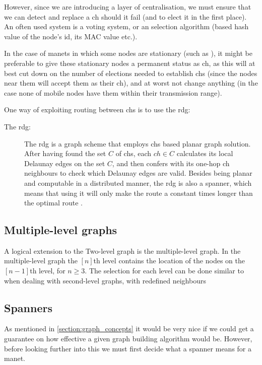 However, since we are introducing a layer of centralisation, we must ensure that we can detect and replace a \ac{ch} should it fail (and to elect it in the first place). An often used system is a voting system, or an selection algorithm (based hash value of the node's id, its MAC value etc.).

In the case of \acp{manet} in which some nodes are stationary (such as \cite{two-tier}), it might be preferable to give these stationary nodes a permanent status as \ac{ch}, as this will at best cut down on the number of elections needed to establish \acp{ch} (since the nodes near them will accept them as their \ac{ch}), and at worst not change anything (in the case none of mobile nodes have them within their transmission range).

One way of exploiting routing between \acp{ch} is to use the \ac{rdg}:
\begin{description}
\item[The \ac{rdg}:] The \ac{rdg} is a graph scheme that employs \acp{ch} based planar graph solution. After having found the set $C$ of \acp{ch}, each $ch \in C$ calculates its local Delaunay edges on the set $C$, and then confers with its one-hop \ac{ch} neighbours to check which Delaunay edges are valid. Besides being planar and computable in a distributed manner, the \ac{rdg} is also a spanner, which means that using it will only make the route a constant times longer than the optimal route \cite{GeoSpanners}.
\end{description}

\subsection{Multiple-level graphs}
A logical extension to the Two-level graph is the multiple-level graph. In the multiple-level graph the $[n]$th level contains the location of the nodes on the $[n-1]$th level, for $n \geq 3$. The selection for each level can be done similar to when dealing with second-level graphs, with redefined neighbours    

\subsection{Spanners}
\label{section:spanners}
As mentioned in \ref{section:graph_concepts} it would be very nice if we could get a guarantee on how effective a given graph building algorithm would be. However, before looking further into this we must first decide what a spanner means for a \ac{manet}.

